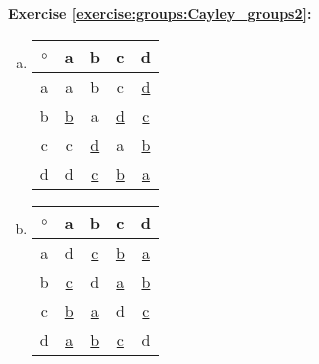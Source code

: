 \noindent\textbf{Exercise \ref{exercise:groups:Cayley_groups2}:}
\begin{multicols}{2}
\begin{enumerate}[(a)]

\item
\begin{center}
		\begin{tabular}{c| c c c c }
			$\circ$ & a & b & c & d\\
			\hline
			a & a & b & c & \underline{d}\\
			b & \underline{b} & a & \underline{d} & \underline{c}\\
			c & c & \underline{d} & a & \underline{b}\\
			d & d & \underline{c} & \underline{b} & \underline{a}
		\end{tabular}
	\end{center}


\item
\begin{center}
		\begin{tabular}{c| c c c c }
			$\circ$ & a & b & c & d\\
			\hline
			a & d & \underline{c} & \underline{b} & \underline{a}\\
			b &\underline{c} & d & \underline{a} & \underline{b}\\
			c & \underline{b} & \underline{a} & d & \underline{c}\\
			d & \underline{a} & \underline{b} & \underline{c} & d
		\end{tabular}
	\end{center}
	

\end{enumerate}
\end{multicols}
